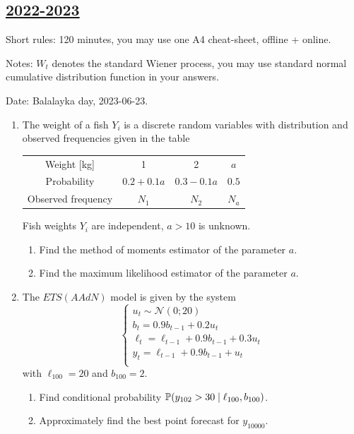 \subsection[2022-2023]{\hyperref[sec:sol_kr_04_2022_2023]{2022-2023}}
\label{sec:kr_04_2022_2023} %

Short rules: 120 minutes, you may use one A4 cheat-sheet, offline +  online.

Notes: $W_t$ denotes the standard Wiener process, 
you may use standard normal cumulative distribution function in your answers.

Date: Balalayka day, 2023-06-23.

\begin{enumerate}

\item The weight of a fish $Y_i$ is a discrete random variables with 
distribution and observed frequencies given in the table 

\begin{tabular}{cccc}
    \toprule
    Weight [kg] & 1 & 2 & $a$ \\
    Probability & $0.2 + 0.1a$ & $0.3 - 0.1a$ & $0.5$ \\
    Observed frequency & $N_1$ & $N_2$ & $N_a$ \\
    \bottomrule
\end{tabular}

Fish weights $Y_i$ are independent, $a > 10$ is unknown. 

\begin{enumerate}
    \item Find the method of moments estimator of the parameter $a$. 
    \item Find the maximum likelihood estimator of the parameter $a$. 
\end{enumerate}


\item The $ETS(AAdN)$ model is given by the system
    \[
    \begin{cases}
    u_t  \sim \mathcal{N}(0;20) \\
    b_t = 0.9 b_{t-1} + 0.2 u_t \\
    \ell_t = \ell_{t-1} + 0.9 b_{t-1} + 0.3 u_t \\
    y_t = \ell_{t-1} + 0.9 b_{t-1} + u_t \\
    \end{cases}
    \]
    with $\ell_{100} = 20$ and $b_{100} = 2$.
\begin{enumerate}
    \item Find conditional probability $\P(y_{102} > 30 \mid \ell_{100}, b_{100})$.
    \item Approximately find the best point forecast for $y_{10000}$.
\end{enumerate}
    

\end{enumerate}
